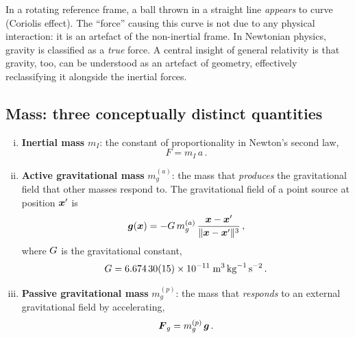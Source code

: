 \begin{intuition}
  In a rotating reference frame, a ball thrown in a straight line
  \emph{appears} to curve (Coriolis effect).  The ``force'' causing this
  curve is not due to any physical interaction: it is an artefact of the
  non-inertial frame.  In Newtonian physics, gravity is classified as a
  \emph{true} force.  A central insight of general relativity is that
  gravity, too, can be understood as an artefact of geometry, effectively
  reclassifying it alongside the inertial forces.
\end{intuition}

\subsection{Mass: three conceptually distinct quantities}

\begin{enumerate}[(i)]
  \item \textbf{Inertial mass} $m_I$: the constant of proportionality in
    Newton's second law,
    \begin{equation}\label{eq:newton2-abstract}
      F = m_I\, a\,.
    \end{equation}

  \item \textbf{Active gravitational mass} $m_g^{(a)}$: the mass that
    \emph{produces} the gravitational field that other masses respond to.
    The gravitational field of a point source at position $\boldsymbol{x}'$ is
    \begin{equation}\label{eq:grav-field-point}
      \boldsymbol{g}(\boldsymbol{x})
        = -G\, m_g^{(a)}\,
          \frac{\boldsymbol{x} - \boldsymbol{x}'}{\lVert \boldsymbol{x} - \boldsymbol{x}' \rVert^3}\,,
    \end{equation}
    where $G$ is the gravitational constant,
    \begin{equation}
      G = 6.674\,30(15) \times 10^{-11}\;\mathrm{m}^3\,
              \mathrm{kg}^{-1}\,\mathrm{s}^{-2}\,.
    \end{equation}

  \item \textbf{Passive gravitational mass} $m_g^{(p)}$: the mass that
    \emph{responds} to an external gravitational field by accelerating,
    \begin{equation}\label{eq:grav-force}
      \boldsymbol{F}_g = m_g^{(p)}\,\boldsymbol{g}\,.
    \end{equation}
\end{enumerate}

